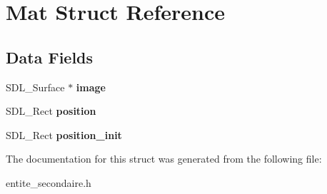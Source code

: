 \hypertarget{structMat}{}\section{Mat Struct Reference}
\label{structMat}
\subsection*{Data Fields}
\begin{DoxyCompactItemize}
\item 
\mbox{\label{structMat_a01bad0c62ccd5aadb041c2f55a92d57e}} 
S\+D\+L\+\_\+\+Surface $\ast$ {\bfseries image}
\item 
\mbox{\label{structMat_a739ffbb7e00b7331964550bece4ece1e}} 
S\+D\+L\+\_\+\+Rect {\bfseries position}
\item 
\mbox{\label{structMat_a280f9d2011149d891d2e5f9c5672c78d}} 
S\+D\+L\+\_\+\+Rect {\bfseries position\+\_\+init}
\end{DoxyCompactItemize}


The documentation for this struct was generated from the following file\+:\begin{DoxyCompactItemize}
\item 
entite\+\_\+secondaire.\+h\end{DoxyCompactItemize}
